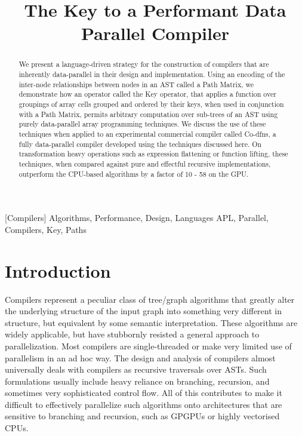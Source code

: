 ﻿\documentclass[numbers,10pt,preprint]{sigplanconf}
\begin{document}
\title{The Key to a Performant Data Parallel Compiler}
\authorinfo{}{}{}

\maketitle

\begin{abstract}
We present a language-driven strategy for the construction of compilers that are inherently data-parallel in their design and implementation. Using an encoding of the inter-node relationships between nodes in an AST called a Path Matrix, we demonstrate how an operator called the Key operator, that applies a function over groupings of array cells grouped and ordered by their keys, when used in conjunction with a Path Matrix, permits arbitrary computation over sub-trees of an AST using purely data-parallel array programming techniques. We discuss the use of these techniques when applied to an experimental commercial compiler called Co-dfns, a fully data-parallel compiler developed using the techniques discussed here. On transformation heavy operations such as expression flattening or function lifting, these techniques, when compared against pure and effectful recursive implementations, outperform the CPU-based algorithms by a factor of 10 - 58 on the GPU. 
\end{abstract}

[Compilers]
\terms Algorithms, Performance, Design, Languages
\keywords APL, Parallel, Compilers, Key, Paths

\section{Introduction}

Compilers represent a peculiar class of tree/graph algorithms that greatly alter the underlying structure of the input graph into something very different in structure, but equivalent by some semantic interpretation. These algorithms are widely applicable, but have stubbornly resisted a general approach to parallelization. Most compilers are single-threaded or make very limited use of parallelism in an ad hoc way. The design and analysis of compilers almost universally deals with compilers as recursive traversals over ASTs. Such formulations usually include heavy reliance on branching, recursion, and sometimes very sophisticated control flow. All of this contributes to make it difficult to effectively parallelize such algorithms onto architectures that are sensitive to branching and recursion, such as GPGPUs or highly vectorised CPUs.
\end{document}
